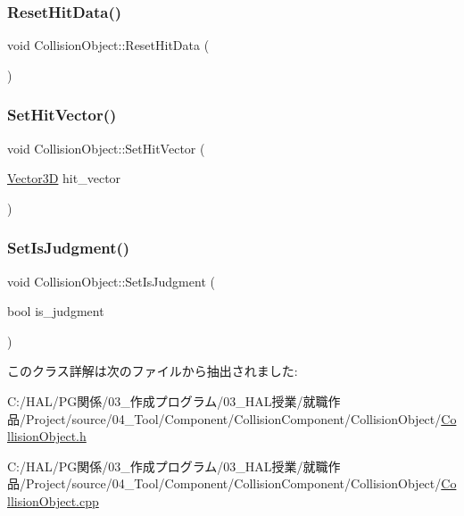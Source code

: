 \subsubsection{\texorpdfstring{Reset\+Hit\+Data()}{ResetHitData()}}
{\footnotesize\ttfamily void Collision\+Object\+::\+Reset\+Hit\+Data (\begin{DoxyParamCaption}{ }\end{DoxyParamCaption})}

\mbox{\label{class_collision_object_acd9790e26ebd136bf4ad3dd4eb56c881}} 
\subsubsection{\texorpdfstring{Set\+Hit\+Vector()}{SetHitVector()}}
{\footnotesize\ttfamily void Collision\+Object\+::\+Set\+Hit\+Vector (\begin{DoxyParamCaption}\item[{\mbox{\hyperlink{class_vector3_d}{Vector3D}}}]{hit\+\_\+vector }\end{DoxyParamCaption})\hspace{0.3cm}{\ttfamily [inline]}}

\mbox{\label{class_collision_object_a22b0732ec2a005fe03991ae528c82f4c}} 
\subsubsection{\texorpdfstring{Set\+Is\+Judgment()}{SetIsJudgment()}}
{\footnotesize\ttfamily void Collision\+Object\+::\+Set\+Is\+Judgment (\begin{DoxyParamCaption}\item[{bool}]{is\+\_\+judgment }\end{DoxyParamCaption})\hspace{0.3cm}{\ttfamily [inline]}}



このクラス詳解は次のファイルから抽出されました\+:\begin{DoxyCompactItemize}
\item 
C\+:/\+H\+A\+L/\+P\+G関係/03\+\_\+作成プログラム/03\+\_\+\+H\+A\+L授業/就職作品/\+Project/source/04\+\_\+\+Tool/\+Component/\+Collision\+Component/\+Collision\+Object/\mbox{\hyperlink{_collision_object_8h}{Collision\+Object.\+h}}\item 
C\+:/\+H\+A\+L/\+P\+G関係/03\+\_\+作成プログラム/03\+\_\+\+H\+A\+L授業/就職作品/\+Project/source/04\+\_\+\+Tool/\+Component/\+Collision\+Component/\+Collision\+Object/\mbox{\hyperlink{_collision_object_8cpp}{Collision\+Object.\+cpp}}\end{DoxyCompactItemize}
